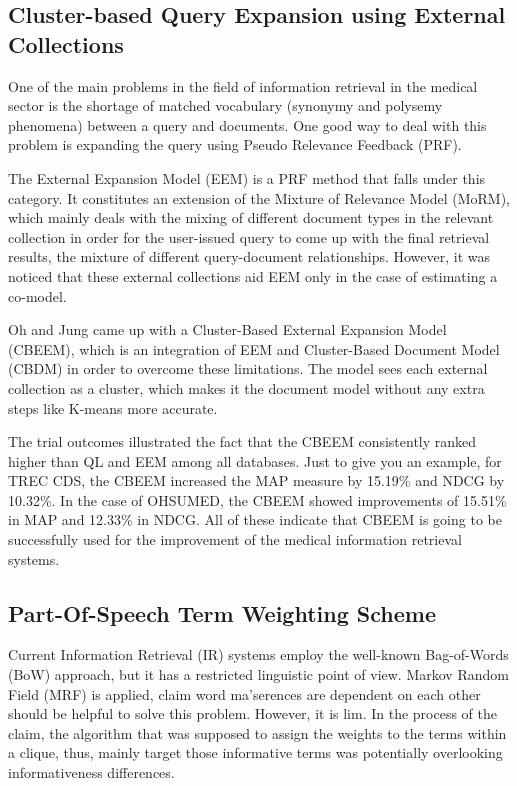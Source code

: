\documentclass[conference]{IEEEtran}
\begin{document}
\subsection{Cluster-based Query Expansion using External Collections}

One of the main problems in the field of information retrieval in the medical sector is the shortage of matched vocabulary (synonymy and polysemy phenomena) between a query and documents. One good way to deal with this problem is expanding the query using Pseudo Relevance Feedback (PRF).

The External Expansion Model (EEM) is a PRF method that falls under this category. It constitutes an extension of the Mixture of Relevance Model (MoRM), which mainly deals with the mixing of different document types in the relevant collection in order for the user-issued query to come up with the final retrieval results, the mixture of different query-document relationships. However, it was noticed that these external collections aid EEM only in the case of estimating a co-model.

Oh and Jung \cite{Oh2015} came up with a Cluster-Based External Expansion Model (CBEEM), which is an integration of EEM and Cluster-Based Document Model (CBDM) in order to overcome these limitations. The model sees each external collection as a cluster, which makes it the document model without any extra steps like K-means more accurate.

The trial outcomes illustrated the fact that the CBEEM consistently ranked higher than QL and EEM among all databases. Just to give you an example, for TREC CDS, the CBEEM increased the MAP measure by 15.19\% and NDCG by 10.32\%. In the case of OHSUMED, the CBEEM showed improvements of 15.51\% in MAP and 12.33\% in NDCG. All of these indicate that CBEEM is going to be successfully used for the improvement of the medical information retrieval systems.

\subsection{Part-Of-Speech Term Weighting Scheme}

Current Information Retrieval (IR) systems employ the well-known Bag-of-Words (BoW) approach, but it has a restricted linguistic point of view. Markov Random Field (MRF) is applied, claim word ma'serences are dependent on each other should be helpful to solve this problem. However, it is lim. In the process of the claim, the algorithm that was supposed to assign the weights to the terms within a clique, thus, mainly target those informative terms was potentially overlooking informativeness differences.
\end{document}
